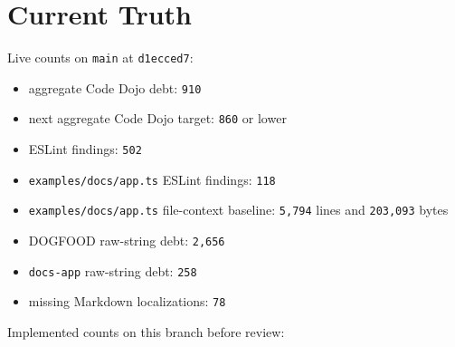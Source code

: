 \section{Current Truth}\label{record-198-current-truth}

Live counts on \texttt{m\allowbreak{}a\allowbreak{}i\allowbreak{}n} at \texttt{d\allowbreak{}1\allowbreak{}e\allowbreak{}c\allowbreak{}c\allowbreak{}e\allowbreak{}d\allowbreak{}7}:

\begin{itemize}
\tightlist
\item
  aggregate Code Dojo debt: \texttt{9\allowbreak{}1\allowbreak{}0}
\item
  next aggregate Code Dojo target: \texttt{8\allowbreak{}6\allowbreak{}0} or lower
\item
  ESLint findings: \texttt{5\allowbreak{}0\allowbreak{}2}
\item
  \texttt{e\allowbreak{}x\allowbreak{}a\allowbreak{}m\allowbreak{}p\allowbreak{}l\allowbreak{}e\allowbreak{}s\allowbreak{}/\allowbreak{}d\allowbreak{}o\allowbreak{}c\allowbreak{}s\allowbreak{}/\allowbreak{}a\allowbreak{}p\allowbreak{}p\allowbreak{}.\allowbreak{}t\allowbreak{}s} ESLint findings: \texttt{1\allowbreak{}1\allowbreak{}8}
\item
  \texttt{e\allowbreak{}x\allowbreak{}a\allowbreak{}m\allowbreak{}p\allowbreak{}l\allowbreak{}e\allowbreak{}s\allowbreak{}/\allowbreak{}d\allowbreak{}o\allowbreak{}c\allowbreak{}s\allowbreak{}/\allowbreak{}a\allowbreak{}p\allowbreak{}p\allowbreak{}.\allowbreak{}t\allowbreak{}s} file-context baseline: \texttt{5\allowbreak{},\allowbreak{}7\allowbreak{}9\allowbreak{}4} lines and \texttt{2\allowbreak{}0\allowbreak{}3\allowbreak{},\allowbreak{}0\allowbreak{}9\allowbreak{}3} bytes
\item
  DOGFOOD raw-string debt: \texttt{2\allowbreak{},\allowbreak{}6\allowbreak{}5\allowbreak{}6}
\item
  \texttt{d\allowbreak{}o\allowbreak{}c\allowbreak{}s\allowbreak{}-\allowbreak{}a\allowbreak{}p\allowbreak{}p} raw-string debt: \texttt{2\allowbreak{}5\allowbreak{}8}
\item
  missing Markdown localizations: \texttt{7\allowbreak{}8}
\end{itemize}

Implemented counts on this branch before review:

